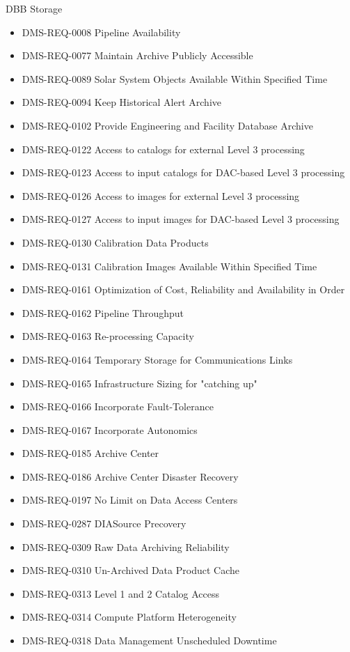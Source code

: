 DBB Storage \begin{itemize}
\item DMS-REQ-0008 Pipeline Availability
\item DMS-REQ-0077 Maintain Archive Publicly Accessible
\item DMS-REQ-0089 Solar System Objects Available Within Specified Time
\item DMS-REQ-0094 Keep Historical Alert Archive
\item DMS-REQ-0102 Provide Engineering and Facility Database Archive
\item DMS-REQ-0122 Access to catalogs for external Level 3 processing
\item DMS-REQ-0123 Access to input catalogs for DAC-based Level 3 processing
\item DMS-REQ-0126 Access to images for external Level 3 processing
\item DMS-REQ-0127 Access to input images for DAC-based Level 3 processing
\item DMS-REQ-0130 Calibration Data Products
\item DMS-REQ-0131 Calibration Images Available Within Specified Time
\item DMS-REQ-0161 Optimization of Cost, Reliability and Availability in Order
\item DMS-REQ-0162 Pipeline Throughput
\item DMS-REQ-0163 Re-processing Capacity
\item DMS-REQ-0164 Temporary Storage for Communications Links
\item DMS-REQ-0165 Infrastructure Sizing for "catching up"
\item DMS-REQ-0166 Incorporate Fault-Tolerance
\item DMS-REQ-0167 Incorporate Autonomics
\item DMS-REQ-0185 Archive Center
\item DMS-REQ-0186 Archive Center Disaster Recovery
\item DMS-REQ-0197 No Limit on Data Access Centers
\item DMS-REQ-0287 DIASource Precovery
\item DMS-REQ-0309 Raw Data Archiving Reliability
\item DMS-REQ-0310 Un-Archived Data Product Cache
\item DMS-REQ-0313 Level 1 and 2 Catalog Access
\item DMS-REQ-0314 Compute Platform Heterogeneity
\item DMS-REQ-0318 Data Management Unscheduled Downtime

\end{itemize}
